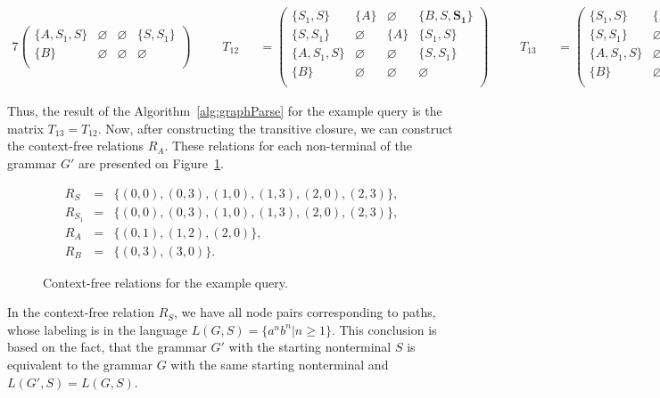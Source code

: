 \begin{figure*}[ht]
\begin{alignat*}{7}
\begin{pmatrix}
\{A, S_1, S\}  & \varnothing & \varnothing & \{S, S_1\} \\
\{B\}       & \varnothing & \varnothing & \varnothing \\
\end{pmatrix} \ \ \ \ &&T_{12} &&= \begin{pmatrix}
\{S_1, S\}     & \{A\}       & \varnothing & \{B, S, \pmb{S_1}\}    \\
\{S, S_1\}       & \varnothing & \{A\}       & \{S_1, S\}     \\
\{A, S_1, S\}  & \varnothing & \varnothing & \{S, S_1\} \\
\{B\}       & \varnothing & \varnothing & \varnothing \\
\end{pmatrix} \ \ \ \ &&T_{13} &&= \begin{pmatrix}
\{S_1, S\}     & \{A\}       & \varnothing & \{B, S, S_1\}    \\
\{S, S_1\}       & \varnothing & \{A\}       & \{S_1, S\}     \\
\{A, S_1, S\}  & \varnothing & \varnothing & \{S, S_1\} \\
\{B\}       & \varnothing & \varnothing & \varnothing \\
\end{pmatrix}
\end{alignat*}
\caption{Remaining states of the matrix $T$.}
\label{ExampleQueryFinalIterations}
\end{figure*}

Thus, the result of the Algorithm~\ref{alg:graphParse} for the example query is the matrix $T_{13} = T_{12}$. Now, after constructing the transitive closure, we can construct the context-free relations $R_A$. These relations for each non-terminal of the grammar $G'$ are presented on Figure~\ref{ExampleQueryCFRelations}.

\begin{figure}[h]
\begin{eqnarray*}
R_S&=&\{(0,0),(0,3),(1,0),(1,3),(2,0),(2,3)\},\\
R_{S_1}&=&\{(0,0),(0,3),(1,0),(1,3),(2,0),(2,3)\},\\
R_{A}&=&\{(0,1),(1,2),(2,0)\}, \\
R_{B}&=&\{(0,3), (3,0)\}.
\end{eqnarray*}
\caption{Context-free relations for the example query.}
\label{ExampleQueryCFRelations}
\end{figure}

In the context-free relation $R_S$, we have all node pairs corresponding to paths, whose labeling is in the language $L(G,S) = \{a^n b^n| n \geq 1\}$. This conclusion is based on the fact, that the grammar $G'$ with the starting nonterminal $S$ is equivalent to the grammar $G$ with the same starting nonterminal and $L(G',S) = L(G,S)$.